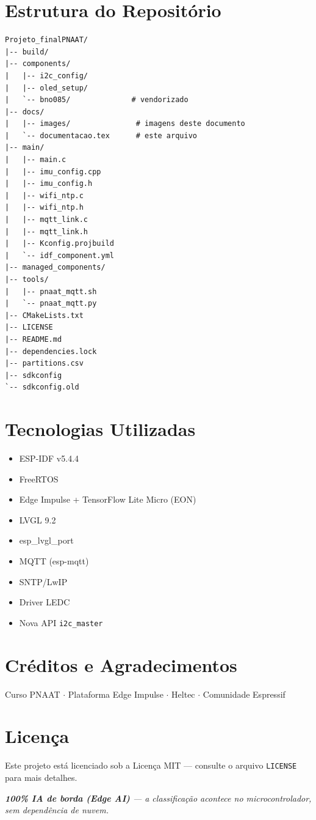 \documentclass[11pt,a4paper]{article}
\begin{document}
\section{Estrutura do Repositório}

\begin{lstlisting}[language={}, basicstyle=\ttfamily\footnotesize]
Projeto_finalPNAAT/
|-- build/
|-- components/
|   |-- i2c_config/
|   |-- oled_setup/
|   `-- bno085/              # vendorizado
|-- docs/
|   |-- images/               # imagens deste documento
|   `-- documentacao.tex      # este arquivo
|-- main/
|   |-- main.c
|   |-- imu_config.cpp
|   |-- imu_config.h
|   |-- wifi_ntp.c
|   |-- wifi_ntp.h
|   |-- mqtt_link.c
|   |-- mqtt_link.h
|   |-- Kconfig.projbuild
|   `-- idf_component.yml
|-- managed_components/
|-- tools/
|   |-- pnaat_mqtt.sh
|   `-- pnaat_mqtt.py
|-- CMakeLists.txt
|-- LICENSE
|-- README.md
|-- dependencies.lock
|-- partitions.csv
|-- sdkconfig
`-- sdkconfig.old
\end{lstlisting}


\section{Tecnologias Utilizadas}

\begin{itemize}[leftmargin=*]
    \item ESP-IDF v5.4.4
    \item FreeRTOS
    \item Edge Impulse + TensorFlow Lite Micro (EON)
    \item LVGL 9.2
    \item esp\_lvgl\_port
    \item MQTT (esp-mqtt)
    \item SNTP/LwIP
    \item Driver LEDC
    \item Nova API \texttt{i2c\_master}
\end{itemize}


\section{Créditos e Agradecimentos}

Curso PNAAT $\cdot$ Plataforma Edge Impulse $\cdot$ Heltec $\cdot$ Comunidade Espressif


\section{Licença}

Este projeto está licenciado sob a Licença MIT — consulte o arquivo \texttt{LICENSE} para mais detalhes.

\vspace{1cm}
\begin{center}
\textit{\textbf{100\% IA de borda (Edge AI)} — a classificação acontece no microcontrolador, sem dependência de nuvem.}
\end{center}
\end{document}
